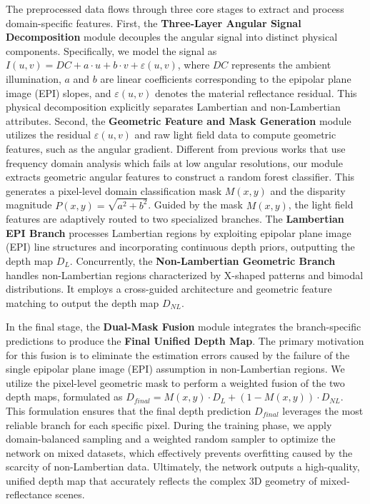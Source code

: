 The preprocessed data flows through three core stages to extract and process domain-specific features. First, the \textbf{Three-Layer Angular Signal Decomposition} module decouples the angular signal into distinct physical components. Specifically, we model the signal as $I(u,v) = DC + a \cdot u + b \cdot v + \varepsilon(u,v)$, where $DC$ represents the ambient illumination, $a$ and $b$ are linear coefficients corresponding to the epipolar plane image (EPI) slopes, and $\varepsilon(u,v)$ denotes the material reflectance residual. This physical decomposition explicitly separates Lambertian and non-Lambertian attributes. Second, the \textbf{Geometric Feature and Mask Generation} module utilizes the residual $\varepsilon(u,v)$ and raw light field data to compute geometric features, such as the angular gradient. Different from previous works that use frequency domain analysis which fails at low angular resolutions, our module extracts geometric angular features to construct a random forest classifier. This generates a pixel-level domain classification mask $M(x,y)$ and the disparity magnitude $P(x,y) = \sqrt{a^2+b^2}$. Guided by the mask $M(x,y)$, the light field features are adaptively routed to two specialized branches. The \textbf{Lambertian EPI Branch} processes Lambertian regions by exploiting epipolar plane image (EPI) line structures and incorporating continuous depth priors, outputting the depth map $D_L$. Concurrently, the \textbf{Non-Lambertian Geometric Branch} handles non-Lambertian regions characterized by X-shaped patterns and bimodal distributions. It employs a cross-guided architecture and geometric feature matching to output the depth map $D_{NL}$.

In the final stage, the \textbf{Dual-Mask Fusion} module integrates the branch-specific predictions to produce the \textbf{Final Unified Depth Map}. The primary motivation for this fusion is to eliminate the estimation errors caused by the failure of the single epipolar plane image (EPI) assumption in non-Lambertian regions. We utilize the pixel-level geometric mask to perform a weighted fusion of the two depth maps, formulated as $D_{final} = M(x,y) \cdot D_L + (1-M(x,y)) \cdot D_{NL}$. This formulation ensures that the final depth prediction $D_{final}$ leverages the most reliable branch for each specific pixel. During the training phase, we apply domain-balanced sampling and a weighted random sampler to optimize the network on mixed datasets, which effectively prevents overfitting caused by the scarcity of non-Lambertian data. Ultimately, the network outputs a high-quality, unified depth map that accurately reflects the complex 3D geometry of mixed-reflectance scenes.

